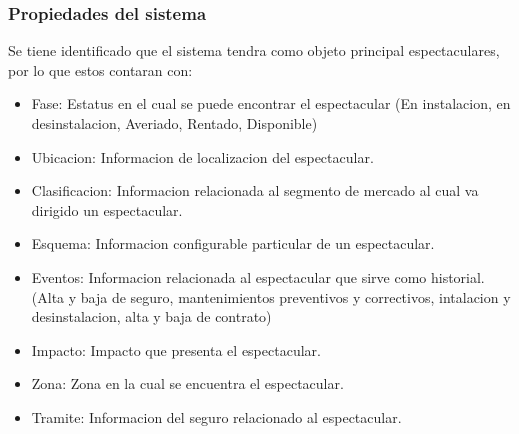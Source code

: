 \subsubsection{Propiedades del sistema}
Se tiene identificado que el sistema tendra como objeto principal espectaculares, por lo que estos contaran con:

\begin{itemize}
	\item Fase: Estatus en el cual se puede encontrar el espectacular (En instalacion, en desinstalacion, Averiado, Rentado, Disponible)
	\item Ubicacion: Informacion de localizacion del espectacular.
	\item Clasificacion: Informacion relacionada al segmento de mercado al cual va dirigido un espectacular.
	\item Esquema: Informacion configurable particular de un espectacular.
	\item Eventos: Informacion relacionada al espectacular que sirve como historial. (Alta y baja de seguro, mantenimientos preventivos y correctivos, intalacion y desinstalacion, alta y baja de contrato)
	\item Impacto: Impacto que presenta el espectacular.
	\item Zona: Zona en la cual se encuentra el espectacular.
	\item Tramite: Informacion del seguro relacionado al espectacular.
\end{itemize}